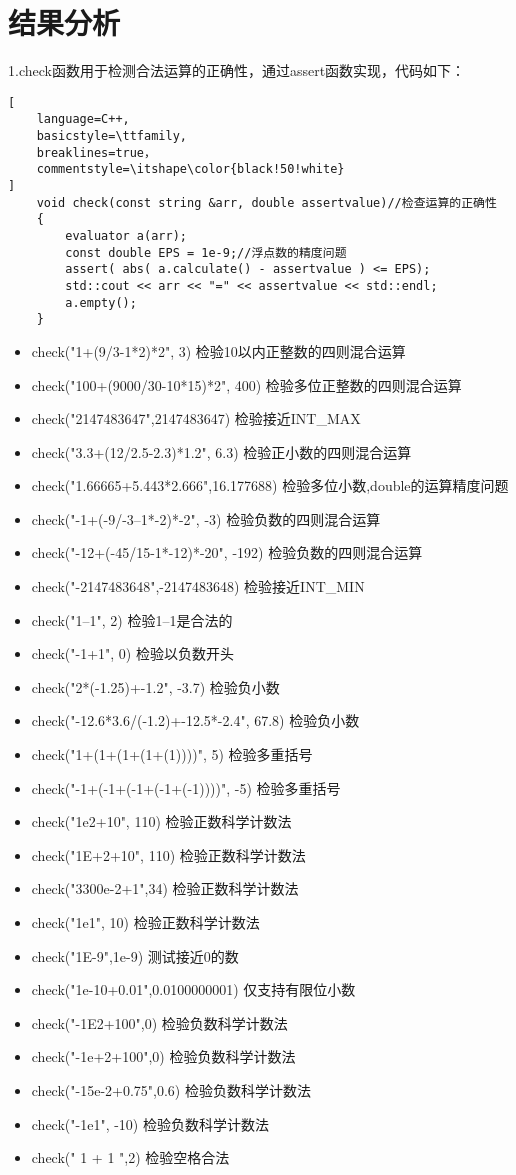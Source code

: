 \documentclass[UTF8]{ctexart}
\begin{document}
\section{结果分析}
1.check函数用于检测合法运算的正确性，通过assert函数实现，代码如下：                                                                                                                                                             
\begin{lstlisting}[
    language=C++,
    basicstyle=\ttfamily,
    breaklines=true，
    commentstyle=\itshape\color{black!50!white}
]
    void check(const string &arr, double assertvalue)//检查运算的正确性
    {
        evaluator a(arr);
        const double EPS = 1e-9;//浮点数的精度问题
        assert( abs( a.calculate() - assertvalue ) <= EPS);
        std::cout << arr << "=" << assertvalue << std::endl;
        a.empty();
    }
\end{lstlisting}
\begin{itemize}
\item check("1+(9/3-1*2)*2", 3) 检验10以内正整数的四则混合运算
\item check("100+(9000/30-10*15)*2", 400) 检验多位正整数的四则混合运算
\item check("2147483647",2147483647) 检验接近INT_MAX
\item check("3.3+(12/2.5-2.3)*1.2", 6.3) 检验正小数的四则混合运算
\item check("1.66665+5.443*2.666",16.177688) 检验多位小数,double的运算精度问题
\item check("-1+(-9/-3--1*-2)*-2", -3) 检验负数的四则混合运算
\item check("-12+(-45/15-1*-12)*-20", -192) 检验负数的四则混合运算
\item check("-2147483648",-2147483648) 检验接近INT_MIN
\item check("1--1", 2) 检验1--1是合法的
\item check("-1+1", 0) 检验以负数开头
\item check("2*(-1.25)+-1.2", -3.7) 检验负小数
\item check("-12.6*3.6/(-1.2)+-12.5*-2.4", 67.8) 检验负小数
\item check("1+(1+(1+(1+(1))))", 5) 检验多重括号
\item check("-1+(-1+(-1+(-1+(-1))))", -5) 检验多重括号
\item check("1e2+10", 110) 检验正数科学计数法
\item check("1E+2+10", 110) 检验正数科学计数法
\item check("3300e-2+1",34) 检验正数科学计数法
\item check("1e1", 10) 检验正数科学计数法
\item check("1E-9",1e-9) 测试接近0的数
\item check("1e-10+0.01",0.0100000001) 仅支持有限位小数
\item check("-1E2+100",0) 检验负数科学计数法
\item check("-1e+2+100",0) 检验负数科学计数法
\item check("-15e-2+0.75",0.6) 检验负数科学计数法
\item check("-1e1", -10) 检验负数科学计数法
\item check(" 1    +    1   ",2) 检验空格合法
\end{itemize}
\end{document}
